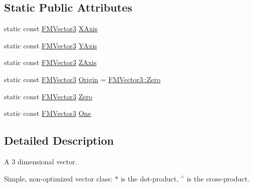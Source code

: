 \subsection*{Static Public Attributes}
\begin{DoxyCompactItemize}
\item 
static const \hyperlink{classFMVector3}{FMVector3} \hyperlink{classFMVector3_a363010f82c60ec1d53a495de6284daf7}{XAxis}
\item 
static const \hyperlink{classFMVector3}{FMVector3} \hyperlink{classFMVector3_a4e67235dec2d974161ecb965b6590555}{YAxis}
\item 
static const \hyperlink{classFMVector3}{FMVector3} \hyperlink{classFMVector3_a3f1666b8e732a6480e3e3ac3416d0a22}{ZAxis}
\item 
static const \hyperlink{classFMVector3}{FMVector3} \hyperlink{classFMVector3_a886c355491c083e2664286caa7aa9ed8}{Origin} = \hyperlink{classFMVector3_a18fc0513121c660cc2dc3f172d698adb}{FMVector3::Zero}
\item 
static const \hyperlink{classFMVector3}{FMVector3} \hyperlink{classFMVector3_a18fc0513121c660cc2dc3f172d698adb}{Zero}
\item 
static const \hyperlink{classFMVector3}{FMVector3} \hyperlink{classFMVector3_a7f981857b8d0f3f6839c0a9ff0c3e430}{One}
\end{DoxyCompactItemize}


\subsection{Detailed Description}
A 3 dimensional vector.

Simple, non-\/optimized vector class: $\ast$ is the dot-\/product, $^\wedge$ is the cross-\/product. 


